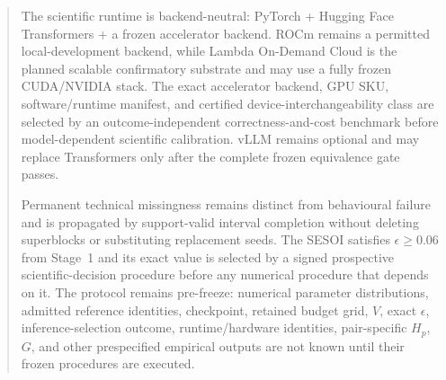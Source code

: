 \documentclass[11pt,a4paper]{article}
\begin{document}
\begin{abstract}
The scientific runtime is backend-neutral: PyTorch + Hugging Face Transformers + a frozen accelerator backend. ROCm remains a permitted local-development backend, while Lambda On-Demand Cloud is the planned scalable confirmatory substrate and may use a fully frozen CUDA/NVIDIA stack. The exact accelerator backend, GPU SKU, software/runtime manifest, and certified device-interchangeability class are selected by an outcome-independent correctness-and-cost benchmark before model-dependent scientific calibration. vLLM remains optional and may replace Transformers only after the complete frozen equivalence gate passes.

Permanent technical missingness remains distinct from behavioural failure and is propagated by support-valid interval completion without deleting superblocks or substituting replacement seeds. The SESOI satisfies $\epsilon\ge0.06$ from Stage~1 and its exact value is selected by a signed prospective scientific-decision procedure before any numerical procedure that depends on it. The protocol remains pre-freeze: numerical parameter distributions, admitted reference identities, checkpoint, retained budget grid, $V$, exact $\epsilon$, inference-selection outcome, runtime/hardware identities, pair-specific $H_p$, $G$, and other prespecified empirical outputs are not known until their frozen procedures are executed.
\end{abstract}
\tableofcontents
\newpage
\end{document}

